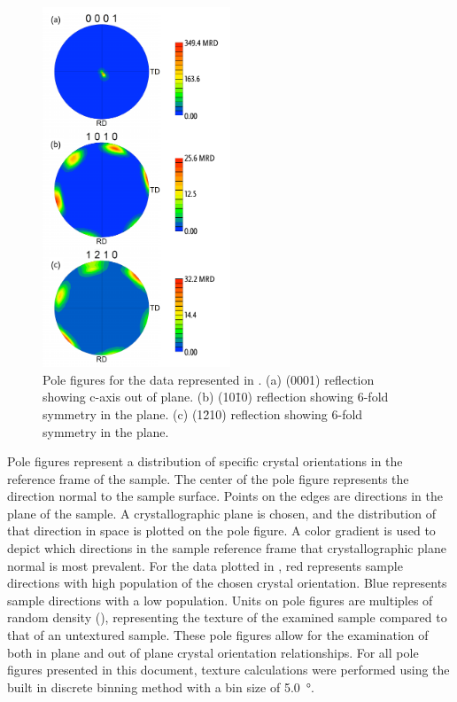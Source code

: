 \begin{figure}
	\centerline{\includegraphics[width=0.5\textwidth]{111polefigures.pdf}}
		\caption[Pole figures for the data represented in ]{%
			Pole figures for the data represented in . 
	(a) (0001) reflection showing c-axis out of plane. (b) (10\={1}0) 
	reflection showing 6-fold symmetry in the plane. (c) (1\={2}10) 
	reflection showing 6-fold symmetry in the plane.}
	\label{fig:111polefigures}
\end{figure}
Pole figures represent a distribution of specific crystal orientations in the reference
frame of the sample. The center of the pole figure represents the direction normal to the
sample surface. Points on the edges are directions in the plane of the sample. A
crystallographic plane is chosen, and the distribution of that direction in space is
plotted on the pole figure. A color gradient is used to depict which directions in the
sample reference frame that crystallographic plane normal is most prevalent. For the data
plotted in , red represents sample directions with high
population of the chosen crystal orientation. Blue represents sample directions with a low
population. Units on pole figures are multiples of random density (), 
representing the texture of the examined sample compared to that of an untextured sample. 
These pole figures allow for the examination of both in plane and out of plane
crystal orientation relationships. For all pole figures presented in this document,
texture calculations were performed using the built in discrete binning method with a bin
size of \SI{5.0}{\degree}.

